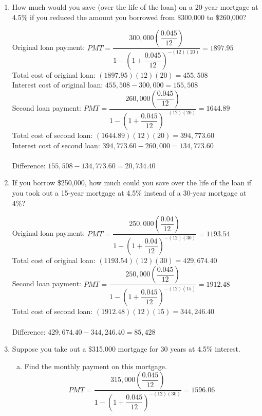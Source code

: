 \begin{enumerate}
\item How much would you save (over the life of the loan) on a 20-year mortgage at 4.5\% if you reduced the amount you borrowed from \$300,000 to \$260,000? 
\begin{center}
Original loan payment: $PMT = \dfrac{300,000\left(\dfrac{0.045}{12}\right)}{1-\left(1+\dfrac{0.045}{12}\right)^{-(12)(20)}} = 1897.95$\\
Total cost of original loan: $(1897.95)(12)(20) = 455,508$\\
Interest cost of original loan: $455,508 - 300,000 = 155,508$\\
Second loan payment: $PMT = \dfrac{260,000\left(\dfrac{0.045}{12}\right)}{1-\left(1+\dfrac{0.045}{12}\right)^{-(12)(20)}} = 1644.89$\\
Total cost of second loan: $(1644.89)(12)(20) = 394,773.60$\\
Interest cost of second loan: $394,773.60 - 260,000 = 134,773.60$\\ \text{}\\
Difference: $155,508 - 134,773.60 = 20,734.40$
\end{center}

\item If you borrow \$250,000, how much could you save over the life of the loan if you took out a 15-year mortgage at 4.5\% instead of a 30-year mortgage at 4\%? 
\begin{center}
Original loan payment: $PMT = \dfrac{250,000\left(\dfrac{0.04}{12}\right)}{1-\left(1+\dfrac{0.04}{12}\right)^{-(12)(30)}} = 1193.54$\\
Total cost of original loan: $(1193.54)(12)(30) = 429,674.40$\\
Second loan payment: $PMT = \dfrac{250,000\left(\dfrac{0.045}{12}\right)}{1-\left(1+\dfrac{0.045}{12}\right)^{-(12)(15)}} = 1912.48$\\
Total cost of second loan: $(1912.48)(12)(15) = 344,246.40$\\ \text{}\\
Difference: $429,674.40 - 344,246.40 = 85,428$
\end{center}

\item Suppose you take out a \$315,000 mortgage for 30 years at 4.5\% interest.
\begin{enumerate}[(a)]
\item Find the monthly payment on this mortgage. 
\[PMT = \dfrac{315,000\left(\dfrac{0.045}{12}\right)}{1-\left(1+\dfrac{0.045}{12}\right)^{-(12)(30)}} = 1596.06\]


\end{enumerate}
\end{enumerate}
